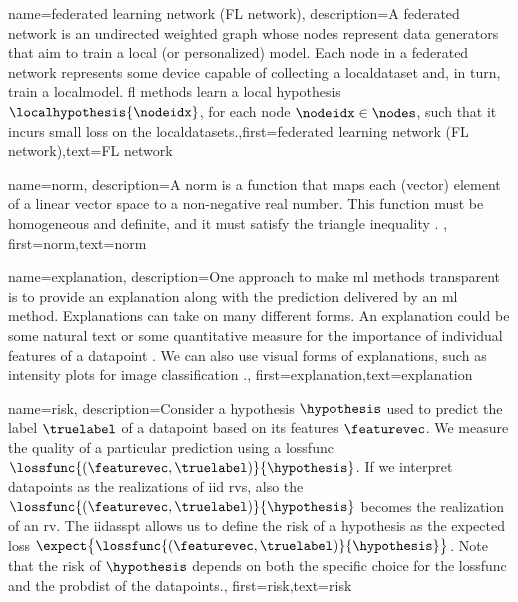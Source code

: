 {{
{name={federated learning network (FL network)},
	description={A federated network is an undirected weighted \gls{graph} whose 
		nodes represent \gls{data} generators that aim to train a local (or personalized) \gls{model}. 
		Each node in a federated network represents some \gls{device} capable of collecting a \gls{localdataset} 
		and, in turn, train a \gls{localmodel}. 
	    \Gls{fl} methods learn a local \gls{hypothesis} $\localhypothesis{\nodeidx}$, for 
	    each node $\nodeidx \in \nodes$, such that it incurs small \gls{loss} on the \gls{localdataset}s.},first={federated learning network (FL network)},text={FL network} 
}

{name={norm},
	description={A norm is a function that maps each (vector) element 
		of a linear vector space to a non-negative real number. This function must be homogeneous and definite, and it must satisfy the triangle inequality \cite{HornMatAnalysis}. },
	first={norm},text={norm} 
}

{name={explanation},
	description={One approach to make \gls{ml} methods transparent is to provide an 
		explanation along with the \gls{prediction} delivered by an 
		\gls{ml} method. Explanations can take on many different forms. An explanation 
		could be some natural text or some quantitative measure for the importance 
		of individual \gls{feature}s of a \gls{datapoint} \cite{Molnar2019}. We can also 
		use visual forms of explanations, such as intensity plots for image \gls{classification} \cite{GradCamPaper}.},
	first={explanation},text={explanation} 
}

{name={risk},
	description={Consider a \gls{hypothesis} $\hypothesis$ used to predict the \gls{label} 
		$\truelabel$ of a \gls{datapoint} based on its \gls{feature}s $\featurevec$. We measure 
		the quality of a particular \gls{prediction} using a \gls{lossfunc} $\lossfunc{(\featurevec,\truelabel)}{\hypothesis}$. 
		If we interpret \gls{datapoint}s as the \gls{realization}s of \gls{iid} \gls{rv}s, 
		also the $\lossfunc{(\featurevec,\truelabel)}{\hypothesis}$ becomes the \gls{realization} 
		of an \gls{rv}. The \gls{iidasspt} allows us to define the risk of a \gls{hypothesis} 
		as the expected \gls{loss} $\expect \big\{\lossfunc{(\featurevec,\truelabel)}{\hypothesis} \big\}$. 
		Note that the risk of $\hypothesis$ depends on both the specific choice for the \gls{lossfunc} and the 
		\gls{probdist} of the \gls{datapoint}s.},
	first={risk},text={risk} 
}

}}
